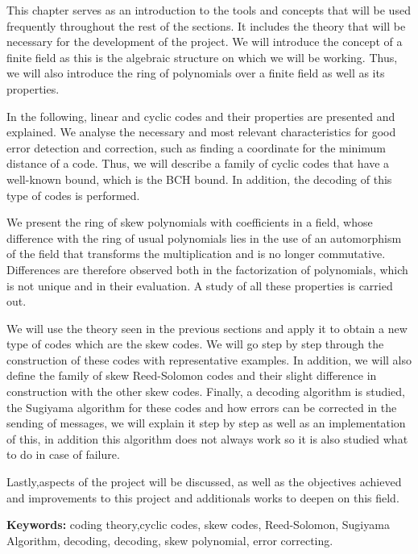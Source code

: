
This chapter serves as an introduction to the tools and concepts that will be used frequently throughout the rest of the sections. It includes the theory that will be necessary for the development of the project. We will introduce the concept of a finite field as this is the algebraic structure on which we will be working. Thus, we will also introduce the ring of polynomials over a finite field as well as its properties. 


In the following, linear and cyclic codes and their properties are presented and explained. We analyse the necessary and most relevant characteristics for good error detection and correction, such as finding a coordinate for the minimum distance of a code. Thus, we will describe a family of cyclic codes that have a well-known bound, which is the BCH bound. In addition, the decoding of this type of codes is performed.


We present the ring of skew polynomials with coefficients in a field, whose difference with the ring of usual polynomials lies in the use of an automorphism of the field that transforms the multiplication and is no longer commutative. Differences are therefore observed both in the factorization of polynomials, which is not unique and in their evaluation. A study of all these properties is carried out.


 We will use the theory seen in the previous sections and apply it to obtain a new type of codes which are the skew codes. We will go step by step through the construction of these codes with representative examples. In addition, we will also define the family of skew Reed-Solomon codes and their slight difference in construction with the other skew codes. Finally, a decoding algorithm is studied, the Sugiyama algorithm for these codes and how errors can be corrected in the sending of messages, we will explain it step by step as well as an implementation of this, in addition this algorithm does not always work so it is also studied what to do in case of failure.


Lastly,aspects of the project will be discussed, as well as the objectives achieved and improvements to this project and additionals works to deepen on this field.

\textbf{Keywords:} coding theory,cyclic codes, skew codes, Reed-Solomon, Sugiyama Algorithm, decoding, decoding, skew polynomial, error correcting. 